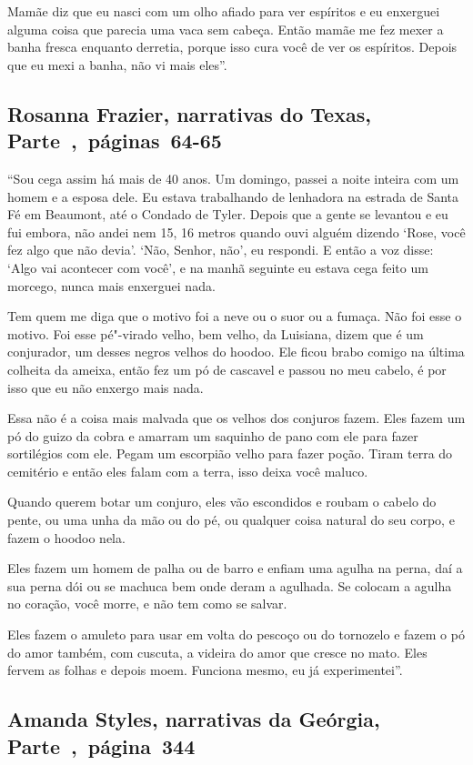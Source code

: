 Mamãe diz que eu nasci com um olho afiado para ver espíritos e eu
enxerguei alguma coisa que parecia uma vaca sem cabeça. Então mamãe me
fez mexer a banha fresca enquanto derretia, porque isso cura você de ver
os espíritos. Depois que eu mexi a banha, não vi mais eles''.

\subsection{Rosanna Frazier, narrativas do Texas, Parte~,~páginas~64-65} \label{ref93}

``Sou cega assim há mais de 40 anos. Um domingo, passei a noite inteira
com um homem e a esposa dele. Eu estava trabalhando de lenhadora na
estrada de Santa Fé em Beaumont, até o Condado de Tyler. Depois que a
gente se levantou e eu fui embora, não andei nem 15, 16 metros quando
ouvi alguém dizendo `Rose, você fez algo que não devia'. `Não, Senhor,
não', eu respondi. E então a voz disse: `Algo vai acontecer com você', e
na manhã seguinte eu estava cega feito um morcego, nunca mais enxerguei
nada.

Tem quem me diga que o motivo foi a neve ou o suor ou a fumaça. Não foi
esse o motivo. Foi esse pé"-virado velho, bem velho, da Luisiana, dizem
que é um conjurador, um desses negros velhos do hoodoo. Ele ficou brabo
comigo na última colheita da ameixa, então fez um pó de cascavel e
passou no meu cabelo, é por isso que eu não enxergo mais nada.

Essa não é a coisa mais malvada que os velhos dos conjuros fazem. Eles
fazem um pó do guizo da cobra e amarram um saquinho de pano com ele para
fazer sortilégios com ele. Pegam um escorpião velho para fazer poção.
Tiram terra do cemitério e então eles falam com a terra, isso deixa você
maluco.

Quando querem botar um conjuro, eles vão escondidos e roubam o cabelo do
pente, ou uma unha da mão ou do pé, ou qualquer coisa natural do seu
corpo, e fazem o hoodoo nela.

Eles fazem um homem de palha ou de barro e enfiam uma agulha na perna,
daí a sua perna dói ou se machuca bem onde deram a agulhada. Se colocam
a agulha no coração, você morre, e não tem como se salvar.

Eles fazem o amuleto para usar em volta do pescoço ou do tornozelo e
fazem o pó do amor também, com cuscuta, a videira do amor que cresce no
mato. Eles fervem as folhas e depois moem. Funciona mesmo, eu já
experimentei''.

\subsection{Amanda Styles, narrativas da Geórgia, Parte~,~página~344}
\label{ref260}

